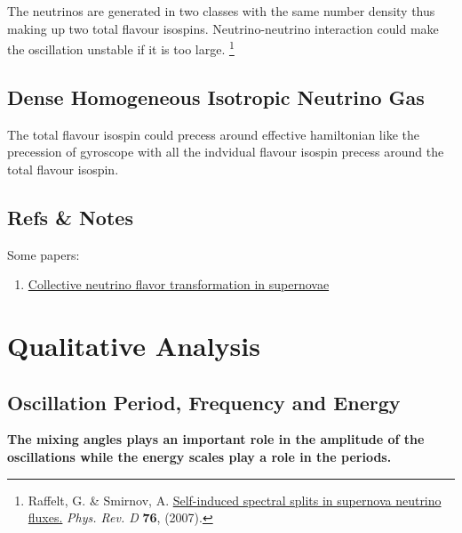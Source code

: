 \documentclass[letterpaper,12pt,english]{sphinxmanual}
\begin{document}
The neutrinos are generated in two classes with the same number density thus making up two total flavour isospins. Neutrino-neutrino interaction could make the oscillation unstable if it is too large. \footnote[2]{
Raffelt, G. \& Smirnov, A. \href{http://journals.aps.org/prd/abstract/10.1103/PhysRevD.74.105010}{Self-induced spectral splits in supernova neutrino fluxes.} \emph{Phys. Rev. D} \textbf{76}, (2007).
}


\section{Dense Homogeneous Isotropic Neutrino Gas}
\label{collective:dense-homogeneous-isotropic-neutrino-gas}\label{collective:index-2}
The total flavour isospin could precess around effective hamiltonian like the precession of gyroscope with all the indvidual flavour isospin precess around the total flavour isospin.


\section{Refs \& Notes}
\label{collective:refs-notes}
Some papers:
\begin{enumerate}
\item {} 
\href{http://link.aps.org/pdf/10.1103/PhysRevD.74.123004}{Collective neutrino flavor transformation in supernovae}

\end{enumerate}


\chapter{Qualitative Analysis}
\label{qualitative:qualitative-analysis}\label{qualitative::doc}

\section{Oscillation Period, Frequency and Energy}
\label{qualitative:oscillation-period-frequency-and-energy}
\textbf{The mixing angles plays an important role in the amplitude of the oscillations while the energy scales play a role in the periods.}
\end{document}

